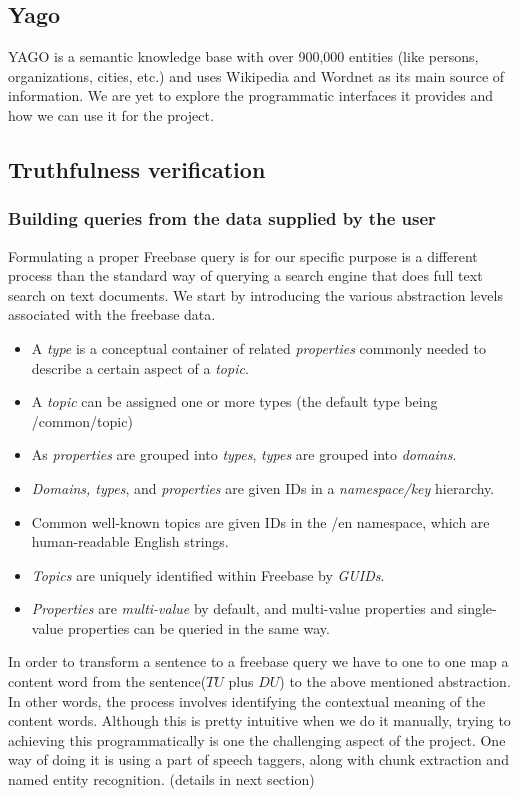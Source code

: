 \documentclass[11pt]{article}
\begin{document}
\subsection{Yago}
YAGO is a semantic knowledge base with over 900,000 entities (like persons,
organizations, cities, etc.) and uses Wikipedia and Wordnet as its main source of
information. We are yet to explore the programmatic interfaces it provides and
how we can use it for the project.


\subsection{Truthfulness verification }
\subsubsection {Building queries from the data supplied by the user}

Formulating a proper Freebase query is for our specific purpose is a different process than the standard way of querying a search engine that does full text search on text documents. We start by introducing the  various abstraction levels associated with the freebase data.
\begin{itemize}
    \item  A {\em type} is a conceptual container of related {\em properties} commonly needed to describe a certain aspect of a {\em topic}.
    \item  A {\em topic} can be assigned one or more types (the default type being /common/topic)
    \item  As {\em properties} are grouped into {\em types}, {\em types} are grouped into {\em domains}.
    \item  {\em Domains, types}, and {\em properties} are given IDs in a {\em namespace/key} hierarchy.
    \item  Common well-known topics are given IDs in the /en namespace, which are human-readable English strings.
    \item  {\em Topics} are uniquely identified within Freebase by {\em GUIDs}.
    \item  {\em Properties} are {\em multi-value} by default, and multi-value properties and single-value properties can be queried in the same way.
\end{itemize}
In order to transform a sentence to a freebase query we have to one to one map a content word from the sentence($TU$ plus $DU$) to the above mentioned abstraction. In other words, the process involves identifying the contextual meaning of the content words. Although this is pretty intuitive when we do it manually, trying to achieving this programmatically is one the challenging aspect of the project. One way of doing it is using a part of speech taggers, along with chunk extraction and named entity recognition. (details in next section) 
\end{document}
